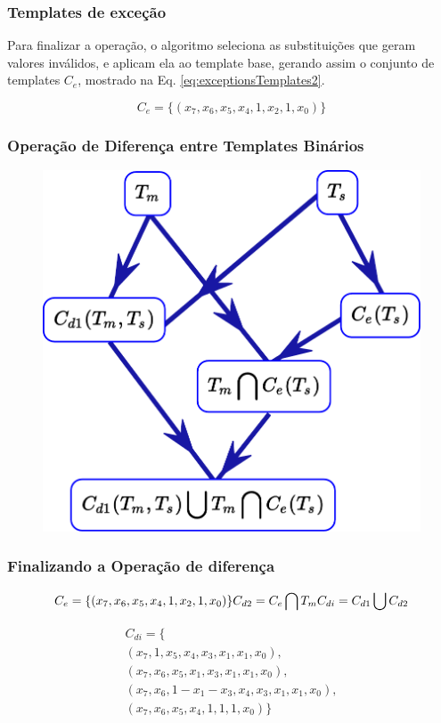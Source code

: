 \documentclass[aspectratio=43,hyperref={pdfpagelabels=false}]{beamer}
\begin{document}
 \begin{frame}
     \frametitle{Templates de exceção}
Para finalizar a operação, o algoritmo seleciona as substituições que geram valores inválidos, e aplicam ela ao template base, gerando assim o conjunto de templates $C_e$, mostrado na  Eq. \ref{eq:exceptionsTemplates2}.

\begin{equation}
C_e = \{(x_7, x_6, x_5, x_4, 1, x_2, 1, x_0)\}
\label{eq:exceptionsTemplates2}
\end{equation}
 \end{frame}

  \begin{frame}
    \frametitle{Operação de Diferença entre Templates Binários}
    \begin{figure}[h!]
      \centering
      \includegraphics[width=.4\textwidth]{grafico2d-e.pdf}
    \end{figure}
 \end{frame}


 \begin{frame}
     \frametitle{Finalizando a Operação de diferença}
    \begin{equation*}
    C_e = \{(x_7, x_6, x_5, x_4, 1, x_2, 1, x_0)\}\\
    C_{d2} = C_e \bigcap  T_m\\
    C_{di} = C_{d1} \bigcup  C_{d2}
    \end{equation*}

    \vspace{-1.0cm}
    \begin{equation}
    \begin{split}
    C_{di} = \{\\(x_7, 1, x_5, x_4, x_3, x_1, x_1, x_0), \\
    (x_7, x_6, x_5, x_1, x_3, x_1, x_1, x_0), \\
    (x_7, x_6, 1 - x_1 - x_3, x_4, x_3, x_1, x_1, x_0), \\
    (x_7, x_6, x_5, x_4, 1, 1, 1, x_0) \}
    \end{split}
    \label{eq:logicalComplement3}
    \end{equation}


 \end{frame}
\end{document}
